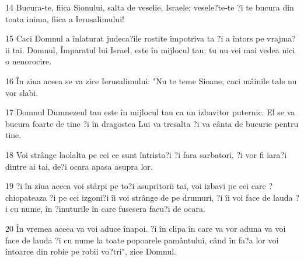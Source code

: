 \par 14 Bucura-te, fiica Sionului, salta de veselie, Israele; vesele?te-te ?i te bucura din toata inima, fiica a Ierusalimului!
\par 15 Caci Domnul a înlaturat judeca?ile rostite împotriva ta ?i a întors pe vrajma?ii tai. Domnul, Împaratul lui Israel, este în mijlocul tau; tu nu vei mai vedea nici o nenorocire.
\par 16 În ziua aceea se va zice Ierusalimului: "Nu te teme Sioane, caci mâinile tale nu vor slabi.
\par 17 Domnul Dumnezeul tau este în mijlocul tau ca un izbavitor puternic. El se va bucura foarte de tine ?i în dragostea Lui va tresalta ?i va cânta de bucurie pentru tine.
\par 18 Voi strânge laolalta pe cei ce sunt întrista?i ?i fara sarbatori, ?i vor fi iara?i dintre ai tai, de?i ocara apasa asupra lor.
\par 19 ?i în ziua aceea voi stârpi pe to?i asupritorii tai, voi izbavi pe cei care ?chiopateaza ?i pe cei izgoni?i îi voi strânge de pe drumuri, ?i îi voi face de lauda ?i cu nume, în ?inuturile în care fusesera facu?i de ocara.
\par 20 În vremea aceea va voi aduce înapoi. ?i în clipa în care va vor aduna va voi face de lauda ?i cu nume la toate popoarele pamântului, când în fa?a lor voi întoarce din robie pe robii vo?tri", zice Domnul.


